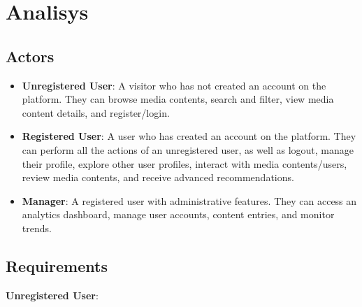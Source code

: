 \chapter{Analisys}

\section {Actors}
\begin{itemize}
    \item \textbf{Unregistered User}: A visitor who has not created an account on the platform. They can browse media contents, search and filter, view media content details, and register/login.
    \item \textbf{Registered User}: A user who has created an account on the platform. They can perform all the actions of an unregistered user, as well as logout, manage their profile, explore other user profiles, interact with media contents/users, review media contents, and receive advanced recommendations.
    \item \textbf{Manager}: A registered user with administrative features. They can access an analytics dashboard, manage user accounts, content entries, and monitor trends.
\end{itemize}

\section{Requirements}
\textbf{Unregistered User}:

